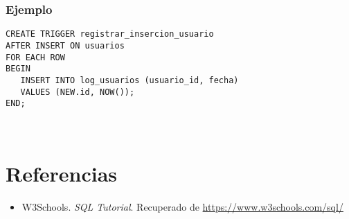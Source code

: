 \documentclass[12pt, a4paper]{article}
\begin{document}
\subsubsection{Ejemplo}
\begin{lstlisting}
CREATE TRIGGER registrar_insercion_usuario
AFTER INSERT ON usuarios
FOR EACH ROW
BEGIN
   INSERT INTO log_usuarios (usuario_id, fecha)
   VALUES (NEW.id, NOW());
END;
\end{lstlisting}

\
\section{Referencias}
\begin{itemize}
    \item W3Schools. \emph{SQL Tutorial}. Recuperado de \url{https://www.w3schools.com/sql/}
\end{itemize}
\end{document}
